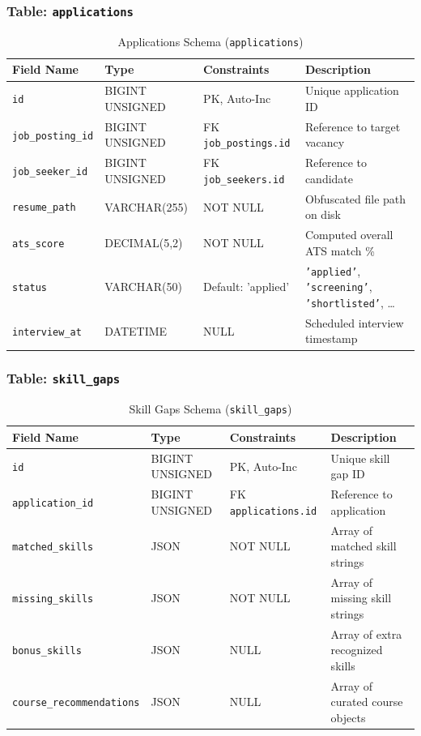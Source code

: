 \subsubsection{Table: \texttt{applications}}
\begin{table}[h!]
\centering
\small
\caption{Applications Schema (\texttt{applications})}
\label{tab:schema_applications}
\begin{tabular}{|p{3cm}|p{2.8cm}|p{2.2cm}|p{5.5cm}|}
\hline
\textbf{Field Name} & \textbf{Type} & \textbf{Constraints} & \textbf{Description} \\ \hline
\texttt{id} & BIGINT UNSIGNED & PK, Auto-Inc & Unique application ID \\ \hline
\texttt{job\_posting\_id}& BIGINT UNSIGNED & FK \texttt{job\_postings.id}& Reference to target vacancy \\ \hline
\texttt{job\_seeker\_id} & BIGINT UNSIGNED & FK \texttt{job\_seekers.id} & Reference to candidate \\ \hline
\texttt{resume\_path} & VARCHAR(255) & NOT NULL & Obfuscated file path on disk \\ \hline
\texttt{ats\_score} & DECIMAL(5,2) & NOT NULL & Computed overall ATS match \% \\ \hline
\texttt{status} & VARCHAR(50) & Default: 'applied' & \texttt{'applied'}, \texttt{'screening'}, \texttt{'shortlisted'}, \dots \\ \hline
\texttt{interview\_at} & DATETIME & NULL & Scheduled interview timestamp \\ \hline
\end{tabular}
\end{table}

\subsubsection{Table: \texttt{skill\_gaps}}
\begin{table}[h!]
\centering
\small
\caption{Skill Gaps Schema (\texttt{skill\_gaps})}
\label{tab:schema_skill_gaps}
\begin{tabular}{|p{3cm}|p{2.8cm}|p{2.2cm}|p{5.5cm}|}
\hline
\textbf{Field Name} & \textbf{Type} & \textbf{Constraints} & \textbf{Description} \\ \hline
\texttt{id} & BIGINT UNSIGNED & PK, Auto-Inc & Unique skill gap ID \\ \hline
\texttt{application\_id} & BIGINT UNSIGNED & FK \texttt{applications.id}& Reference to application \\ \hline
\texttt{matched\_skills} & JSON & NOT NULL & Array of matched skill strings \\ \hline
\texttt{missing\_skills} & JSON & NOT NULL & Array of missing skill strings \\ \hline
\texttt{bonus\_skills} & JSON & NULL & Array of extra recognized skills \\ \hline
\texttt{course\_recommendations} & JSON & NULL & Array of curated course objects \\ \hline
\end{tabular}
\end{table}


